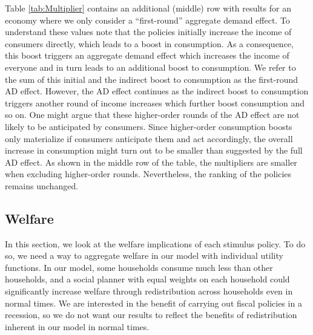 \documentclass[\econtexRoot/HAFiscal]{subfiles}
\begin{document}
Table \ref{tab:Multiplier} contains an additional (middle) row with results for an economy where we only consider a ``first-round'' aggregate demand effect. To understand these values note that the policies initially increase the income of consumers directly, which leads to a boost in consumption. As a consequence, this boost triggers an aggregate demand effect which increases the income of everyone and in turn leads to an additional boost to consumption. We refer to the sum of this initial and the indirect boost to consumption as the first-round AD effect. However, the AD effect continues as the indirect boost to consumption triggers another round of income increases which further boost consumption and so on. One might argue that these higher-order rounds of the AD effect are not likely to be anticipated by consumers. Since higher-order consumption boosts only materialize if consumers anticipate them and act accordingly, the overall increase in consumption might turn out to be smaller than suggested by the full AD effect. As shown in the middle row of the table, the multipliers are smaller when excluding higher-order rounds. Nevertheless, the ranking of the policies remains unchanged.


\hypertarget{welfare}{}\par\subsection{Welfare}
\notinsubfile{\label{sec:welfare}}

In this section, we look at the welfare implications of each stimulus policy. To do so, we need a way to aggregate welfare in our model with individual utility functions. In our model, some households consume much less than other households, and a social planner with equal weights on each household could significantly increase welfare through redistribution across households even in normal times. We are interested in the benefit of carrying out fiscal policies in a recession, so we do not want our results to reflect the benefits of redistribution inherent in our model in normal times.
\end{document}
